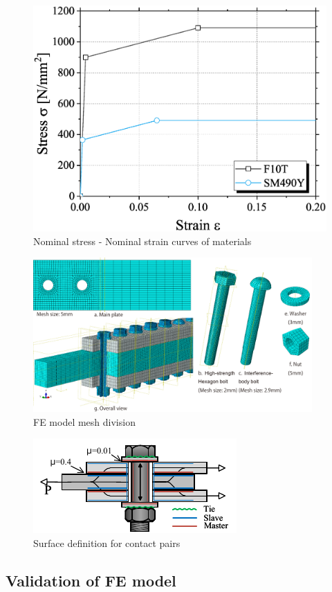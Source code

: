 \begin{figure}[htbp]
    \centering
    \includegraphics[width=0.5\linewidth]{imgs/ch5/mat-pro.eps}
    \caption{Nominal stress - Nominal strain curves of materials}
    \label{fig-matpro}
\end{figure}

\begin{figure}[htbp]
    \centering
    \includegraphics[width=0.95\textwidth]{imgs/ch5/femesh.pdf}
    \caption{FE model mesh division}
    \label{fig-femesh}
\end{figure}

\begin{figure}[htbp]
    \centering
    \includegraphics[width=0.5\linewidth]{imgs/ch5/contactp.pdf}
    \caption{Surface definition for contact pairs}
    \label{fig-contactp}
\end{figure}

\subsection{Validation of FE model}

